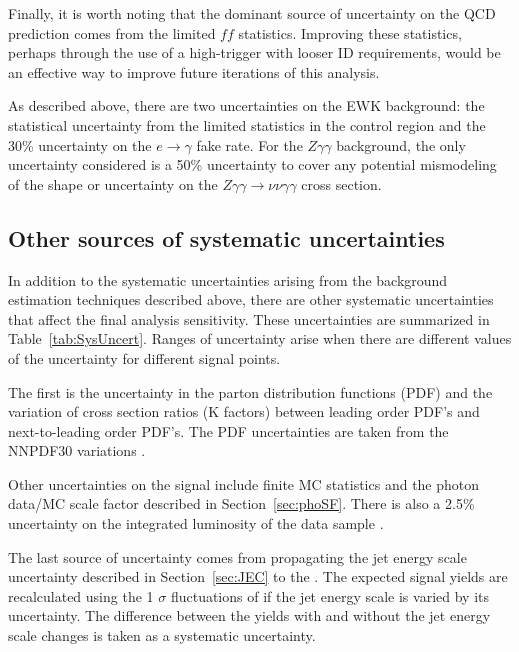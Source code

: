 Finally, it is worth noting that the dominant source of uncertainty on the QCD prediction
comes from the limited $ff$ statistics. Improving these statistics, perhaps through 
the use of a high-\pT trigger with looser ID requirements, would be an effective
way to improve future iterations of this analysis.

As described above, there are two uncertainties on the EWK background: 
the statistical uncertainty from the limited statistics in the control region and 
the 30\% uncertainty on the $e\rightarrow\gamma$ fake rate. 
For the $Z\gamma\gamma$ background, the only uncertainty considered is 
a 50\% uncertainty to cover any potential mismodeling of the \ETmiss shape or 
uncertainty on the $Z\gamma\gamma\rightarrow\nu\nu\gamma\gamma$ cross section. 

\subsection{Other sources of systematic uncertainties}
\label{sec:otherSys}

In addition to the systematic uncertainties arising from the background estimation techniques
described above, there are other systematic uncertainties that affect the
final analysis sensitivity. These uncertainties are summarized in Table~\ref{tab:SysUncert}. 
Ranges of uncertainty arise when there are different values of the uncertainty
for different signal points.
 
The first is the uncertainty in the parton distribution functions (PDF) and the variation of 
cross section ratios (K factors) between leading order PDF's
and next-to-leading order PDF's. The PDF uncertainties are taken from the NNPDF30 variations \cite{Ball:2014uwa,Borschensky:2014cia}.

Other uncertainties on the signal include finite MC statistics and the photon data/MC scale
factor described in Section~\ref{sec:phoSF}. There is also a 2.5\% uncertainty on the integrated
luminosity of the data sample \cite{lumiPAS}. 

The last source of uncertainty comes from propagating the jet energy scale uncertainty described in Section~\ref{sec:JEC} to the \ETmiss. 
The expected signal yields are recalculated using the 1 $\sigma$ fluctuations of \ETmiss if the jet energy scale is varied by its uncertainty. The difference between the yields with and without the jet energy scale changes is taken as a systematic uncertainty. 



